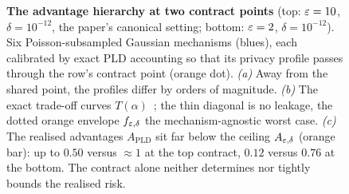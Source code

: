 \begin{figure}[!t]
\caption{\textbf{The advantage hierarchy at two contract points}
(top: $\varepsilon = 10$, $\delta = 10^{-12}$, the paper's canonical
setting; bottom: $\varepsilon = 2$, $\delta = 10^{-12}$). Six
Poisson-subsampled Gaussian mechanisms (blues), each calibrated by
exact PLD accounting so that its privacy profile passes through the
row's contract point (orange dot). \emph{(a)} Away from the shared
point, the profiles differ by orders of magnitude. \emph{(b)} The
exact trade-off curves $T(\alpha)$~\cite{dong2022gaussian}; the thin
diagonal is no leakage, the dotted orange envelope $f_{\varepsilon,\delta}$
the mechanism-agnostic worst case. \emph{(c)} The realised advantages
$A_{\mathrm{PLD}}$ sit far below the ceiling $A_{\varepsilon,\delta}$
(orange bar): up to $0.50$ versus ${\approx}1$ at the top contract,
$0.12$ versus $0.76$ at the bottom. The contract alone neither
determines nor tightly bounds the realised risk.}
\label{fig:hierarchy}
\end{figure}
